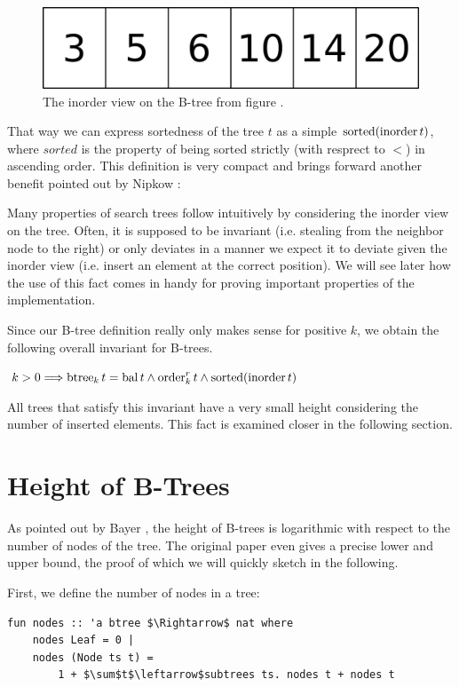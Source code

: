 \begin{figure}
    \centering
    \includegraphics[width=0.3\linewidth]{figures/inorder-basic.pdf}
    \caption[Example inorder of a B-Tree]
    {The inorder view on the B-tree from figure .}
    \label{fig:inorder-basic}
\end{figure}

That way we can express sortedness of the tree $t$ as a simple $\operatorname{sorted} (\operatorname{inorder} t)$,
where $sorted$ is the property of being sorted strictly (with resprect to $<$)
in ascending order.
This definition is very compact and brings forward another benefit
pointed out by Nipkow \parencite{DBLP:conf/itp/Nipkow16}:

Many properties of search trees follow intuitively by considering
the inorder view on the tree.
Often, it is supposed to be invariant (i.e. stealing from the neighbor node to the right)
or only deviates in a manner we expect it to deviate given the inorder view
(i.e. insert an element at the correct position).
We will see later how the use of this fact comes in handy for proving
important properties of the implementation.

Since our B-tree definition really only makes sense for positive $k$,
we obtain the following overall invariant for B-trees.

\begin{definition}
    \label{def:btree-def}
    $k > 0 \Longrightarrow \operatorname{btree}_k t = \operatorname{bal} t \wedge \operatorname{order}^r_k t \wedge \operatorname{sorted} (\operatorname{inorder} t)$
\end{definition}

All trees that satisfy this invariant have a very small
height considering the number of inserted elements.
This fact is examined closer in the following section.

\section{Height of B-Trees}

As pointed out by Bayer \parencite{DBLP:journals/acta/BayerM72},
the height of B-trees is logarithmic with respect to the number
of nodes of the tree.
The original paper even gives a precise lower and upper bound,
the proof of which we will quickly sketch in the following.

First, we define the number of nodes in a tree:
\begin{lstlisting}[mathescape=true, language=Isabelle]
fun nodes :: 'a btree $\Rightarrow$ nat where
    nodes Leaf = 0 |
    nodes (Node ts t) =
        1 + $\sum$t$\leftarrow$subtrees ts. nodes t + nodes t
\end{lstlisting}

